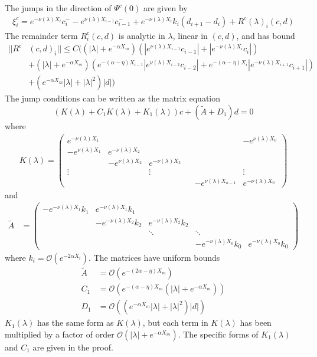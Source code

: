 \documentclass[thesis.tex]{subfiles}
\begin{document}
\begin{lemma}\label{jumpcenteradj}
The jumps in the direction of $\Psi^c(0)$ are given by
\begin{equation}\label{xic}
\begin{aligned}
\xi^c_i = e^{-\nu(\lambda) X_i} c_i^- - e^{\nu(\lambda) X_{i-1}} c_{i-1}^- + e^{-\nu(\lambda) X_i} k_i (d_{i+1} - d_i ) +  R^c(\lambda)_i(c, d)
\end{aligned}
\end{equation}
The remainder term $R^c_i(c, d)$ is analytic in $\lambda$, linear in $(c, d)$, and has bound
\begin{align*}
||R^c&(c, d)_i|| \leq C \Big(
(|\lambda| + e^{-\alpha X_m})(|e^{\nu(\lambda)X_{i-1}}c_{i-1}| + |e^{-\nu(\lambda)X_i}c_i|) \\
&+ (|\lambda| + e^{-\alpha X_m})( e^{-(\alpha - \eta) X_{i-1}} |e^{\nu(\lambda)X_{i-2}}c_{i-2}| + e^{-(\alpha - \eta) X_i} |e^{-\nu(\lambda)X_{i+1}}c_{i+1}|)  \\
&+ (e^{-\alpha X_m}|\lambda| + |\lambda|^2) |d|
\Big)
\end{align*}
The jump conditions can be written as the matrix equation
\begin{equation}\label{matrixjumpc}
(K(\lambda) + C_1 K(\lambda) + K_1(\lambda)) c + (\tilde{A} + D_1) d = 0
\end{equation}
where
\begin{align*}
K(\lambda) =  
\begin{pmatrix}
e^{-\nu(\lambda)X_1} & & & & & -e^{\nu(\lambda)X_0} \\
-e^{\nu(\lambda)X_1} & e^{-\nu(\lambda)X_2} \\
& -e^{\nu(\lambda)X_2} & e^{-\nu(\lambda)X_3} \\
\vdots & & \vdots & &&  \vdots \\
& & & & -e^{\nu(\lambda)X_{n-1}} & e^{-\nu(\lambda)X_0}
\end{pmatrix}
\end{align*}
and
\begin{align*}
\tilde{A} &= \begin{pmatrix}
-e^{-\nu(\lambda)X_1} k_1 & e^{-\nu(\lambda)X_1} k_1 \\
& -e^{-\nu(\lambda)X_2} k_2 & e^{-\nu(\lambda)X_2} k_2 \\
& & \ddots & \ddots \\
& &  & -e^{-\nu(\lambda)X_0} k_0 & e^{-\nu(\lambda)X_0} k_0
\end{pmatrix}
\end{align*}
where $k_i = \mathcal{O}(e^{-2 \alpha X_i})$. The matrices have uniform bounds
\begin{align*}
\tilde{A} &= \mathcal{O}(e^{-(2\alpha - \eta) X_m}) \\
C_1 &= \mathcal{O}(e^{-(\alpha - \eta) X_m}(|\lambda| + e^{-\alpha X_m})) \\
D_1 &= \mathcal{O}((e^{-\alpha X_m}|\lambda| + |\lambda|^2) |d|)
\end{align*}
$K_1(\lambda)$ has the same form as $K(\lambda)$, but each term in $K(\lambda)$ has been multiplied by a factor of order $\mathcal{O}(|\lambda| + e^{-\alpha X_m})$. The specific forms of $K_1(\lambda)$ and $C_1$ are given in the proof.


\end{lemma}
\end{document}
